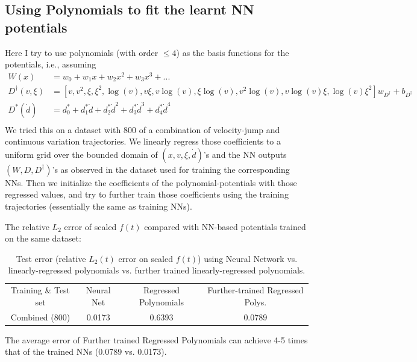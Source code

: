 \subsection{Using Polynomials to fit the learnt NN potentials}
Here I try to use polynomials (with order $\le 4$) as the basis functions for the potentials, i.e., 
assuming 
\begin{align*}
    W(x) &= w_0 + w_1 x + w_2 x^2 + w_3 x^3 + ... \\
    D^\dagger(v, \xi) &= \left[v, v^2, \xi, \xi^2, \log(v), v\xi, 
                          v\log(v), \xi \log(v), v^2\log(v), v\log(v) \xi, 
                          \log(v)\xi^2 \right] w_{D^\dagger} + b_{D^\dagger} \\
    D^*(\dot{d}) &= d^*_0 + d^*_1 \dot{d} + d^*_2 \dot{d}^2 + d^*_3 \dot{d}^3 + d^*_4 \dot{d}^4 \\
\end{align*}
We tried this on a dataset with $800$ of a combination of velocity-jump and continuous variation trajectories. 
We linearly regress those coefficients to a uniform grid over the bounded domain of $(x, v, \xi, \dot{d})$'s and the NN outputs $(W, D, D^\dagger)$'s as observed in the dataset used for training the corresponding NNs. 
Then we initialize the coefficients of the polynomial-potentials with those regressed values, 
and try to further train those coefficients using the training trajectories (essentially the same as training NNs). 

The relative $L_2$ error of scaled $f(t)$ compared with NN-based potentials trained on the same dataset:
\begin{table}[H]
    \centering
    \begin{tabular}{c|ccc}
        \hline
        Training \& Test set & Neural Net & Regressed Polynomials & Further-trained Regressed Polys. \\
        Combined (800) & 0.0173 & 0.6393 & 0.0789 \\
        \hline
    \end{tabular}
    \caption{Test error (relative $L_2(t)$ error on scaled $f(t)$) using Neural Network vs. linearly-regressed polynomials vs. further trained linearly-regressed polynomials. }
    \label{tab:NNVsPolynomialErr}
\end{table}
The average error of Further trained Regressed Polynomials can achieve 4-5 times that of the trained NNs (0.0789 vs. 0.0173).  
